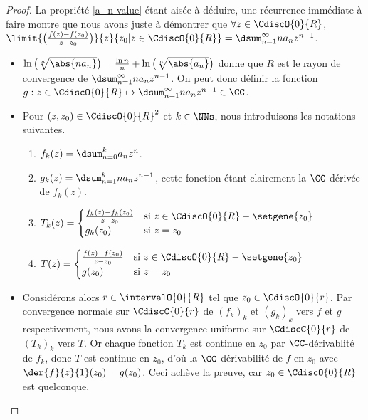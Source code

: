 \begin{proof}
	La propriété \ref{a_n-value} étant aisée à déduire, une récurrence immédiate à faire montre que nous avons juste à démontrer que
	$\forall z \in \CdiscO{0}{R}$,
	$ \limit{\big( \frac{f(z) - f(z_0)}{z - z_0} \big)}%
	        {z}{z_0 | z \in \CdiscO{0}{R}}
	= \dsum_{n = 1}^{\infty} n a_n z^{n - 1}$.
	\begin{itemize}
		\item
		$ \ln \big( \sqrt[n]{\abs{n a_n}} \big)
		= \frac{\ln n}{n} + \ln \big( \sqrt[n]{\abs{a_n}} \big)$
		donne que
		$R$ est le rayon de convergence de
		$\dsum_{n = 1}^{\infty} n a_n z^{n - 1}$.
		On peut donc définir la fonction $g: z \in \CdiscO{0}{R} \mapsto \dsum_{n = 1}^{\infty} n a_n z^{n - 1} \in \CC$.


		\item Pour $(z , z_0) \in \CdiscO{0}{R}^2$ et $k \in \NNs$, nous introduisons les notations suivantes.
        \begin{enumerate}[label=(\alph*)]
	        \item $f_k(z) = \dsum_{n = 0}^{k} a_n z^n$.

	        \item $g_k(z) = \dsum_{n = 1}^{k} n a_n z^{n-1}$,
	        cette fonction étant clairement la $\CC$-dérivée de $f_k(z)$.

	        \item $T_k(z) =
			\begin{cases}
	    		  \frac{f_k(z) - f_k(z_0)}{z - z_0}
				& \text{si $z \in \CdiscO{0}{R} - \setgene{z_0}$}
				\\
	   			  g_k(z_0) 
				& \text{si $z = z_0$}
	 		\end{cases}$

	        \item $T(z) =
			\begin{cases}
	    		  \frac{f(z) - f(z_0)}{z - z_0} 
				& \text{si $z \in \CdiscO{0}{R} - \setgene{z_0}$}
				\\
	   			  g(z_0)
				& \text{si $z = z_0$}
	 		\end{cases}$
	    \end{enumerate}


		\item Considérons alors $r \in \intervalO{0}{R}$ tel que $z_0 \in \CdiscO{0}{r}$.
		Par convergence normale sur $\CdiscC{0}{r}$ de $(f_k)_k$ et $(g_k)_k$ vers $f$ et $g$ respectivement,
		nous avons la convergence uniforme sur $\CdiscC{0}{r}$ de $(T_k)_k$ vers $T$. 
		Or chaque fonction $T_k$ est continue en $z_0$ par $\CC$-dérivablité de $f_k$, donc $T$ est continue en $z_0$,
		d'où
		la $\CC$-dérivabilité de  $f$ en $z_0$ avec $\der{f}{z}{1}(z_0) = g(z_0)$.
		Ceci achève la preuve, car $z_0 \in \CdiscO{0}{R}$ est quelconque.
	\end{itemize}
\end{proof}


